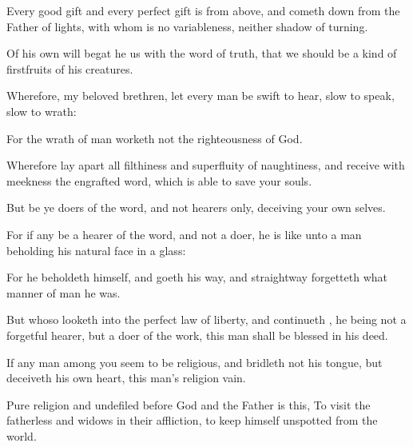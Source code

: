 {Every
good
gift
and
every
perfect
gift
is from
above, and cometh
down
from the
Father of
lights,
with
whom
is
no
variableness,
neither
shadow of
turning.

Of his own
will begat
he
us with the
word of
truth, that
we should
be a
kind of
firstfruits of
his
creatures.


\par }{\PP {}Wherefore,
my
beloved
brethren, let
every
man
be
swift
to
hear,
slow
to
speak,
slow
to
wrath:

For the
wrath of
man
worketh
not the
righteousness of
God.

Wherefore lay
apart
all
filthiness
and
superfluity of
naughtiness, and
receive
with
meekness the
engrafted
word,
which is
able to
save
your
souls.

But
be ye
doers of the
word,
and
not
hearers
only,
deceiving your own
selves.

For
if
any be a
hearer of the
word,
and
not a
doer,
he
is like
unto a
man
beholding
his
natural
face
in a
glass:

For he
beholdeth
himself,
and goeth his
way,
and
straightway
forgetteth what manner of
man he
was.

But whoso
looketh
into the
perfect
law of
liberty,
and
continueth
{},
he
being
not a
forgetful
hearer,
but a
doer of the
work, this
man shall
be
blessed
in
his
deed.

If any
man
among
you
seem to
be
religious, and
bridleth
not
his
tongue,
but
deceiveth his
own
heart, this
man’s
religion
{}
vain.

Pure
religion
and
undefiled
before
God
and the
Father
is
this, To
visit the
fatherless
and
widows
in
their
affliction,
{} to
keep
himself
unspotted
from the
world.




\par }
